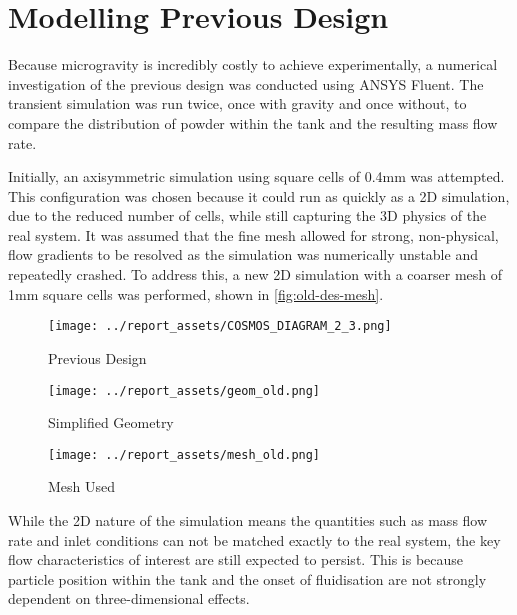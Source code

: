 \section{Modelling Previous Design}\label{sec:old-design-method}
Because microgravity is incredibly costly to achieve experimentally, a numerical investigation of the previous design was conducted using ANSYS Fluent. The transient simulation was run twice, once with gravity and once without, to compare the distribution of powder within the tank and the resulting mass flow rate. 

Initially, an axisymmetric simulation using square cells of 0.4mm was attempted. This configuration was chosen because it could run as quickly as a 2D simulation, due to the reduced number of cells, while still capturing the 3D physics of the real system. It was assumed that the fine mesh allowed for strong, non-physical, flow gradients to be resolved as the simulation was numerically unstable and repeatedly crashed. To address this, a new 2D simulation with a coarser mesh of 1mm square cells was performed, shown in \autoref{fig:old-des-mesh}.
\begin{figure}[htbp]
    \centering

    \begin{minipage}{0.25\textwidth}
        \centering
        \texttt{[image: ../report\_assets/COSMOS\_DIAGRAM\_2\_3.png]}
        \caption{Previous Design}
    \end{minipage}
    \hfill
    \begin{minipage}{0.25\textwidth}
        \centering
        \texttt{[image: ../report\_assets/geom\_old.png]}
        \caption{Simplified Geometry}\label{fig:simpl-geom}
    \end{minipage}
    \hfill
    \begin{minipage}{0.25\textwidth}
        \centering
        \texttt{[image: ../report\_assets/mesh\_old.png]}
        \caption{Mesh Used}\label{fig:old-des-mesh}
    \end{minipage}
    
\end{figure}
While the 2D nature of the simulation means the quantities such as mass flow rate and inlet conditions can not be matched exactly to the real system, the key flow characteristics of interest are still expected to persist. This is because particle position within the tank and the onset of fluidisation are not strongly dependent on three-dimensional effects.

